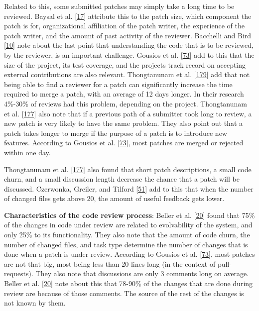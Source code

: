 \documentclass[]{book}
\begin{document}
Related to this, some submitted patches may simply take a long time to
be reviewed. Baysal et al.
{[}\protect\hyperlink{ref-baysal2016investigating}{17}{]} attribute this
to the patch size, which component the patch is for, organizational
affiliation of the patch writer, the experience of the patch writer, and
the amount of past activity of the reviewer. Bacchelli and Bird
{[}\protect\hyperlink{ref-bacchelli2013expectations}{10}{]} note about
the last point that understanding the code that is to be reviewed, by
the reviewer, is an important challenge. Gousios et al.
{[}\protect\hyperlink{ref-gousios2014exploratory}{73}{]} add to this
that the size of the project, its test coverage, and the projects track
record on accepting external contributions are also relevant.
Thongtanunam et al.
{[}\protect\hyperlink{ref-thongtanunam2015should}{179}{]} add that not
being able to find a reviewer for a patch can significantly increase the
time required to merge a patch, with an average of 12 days longer. In
their research 4\%-30\% of reviews had this problem, depending on the
project. Thongtanunam et al.
{[}\protect\hyperlink{ref-thongtanunam2017review}{177}{]} also note that
if a previous path of a submitter took long to review, a new patch is
very likely to have the same problem. They also point out that a patch
takes longer to merge if the purpose of a patch is to introduce new
features. According to Gousios et al.
{[}\protect\hyperlink{ref-gousios2014exploratory}{73}{]}, most patches
are merged or rejected within one day.

Thongtanunam et al.
{[}\protect\hyperlink{ref-thongtanunam2017review}{177}{]} also found
that short patch descriptions, a small code churn, and a small
discussion length decrease the chance that a patch will be discussed.
Czerwonka, Greiler, and Tilford
{[}\protect\hyperlink{ref-czerwonka2015code}{51}{]} add to this that
when the number of changed files gets above 20, the amount of useful
feedback gets lower.

\textbf{Characteristics of the code review process}: Beller et al.
{[}\protect\hyperlink{ref-beller2014modern}{20}{]} found that 75\% of
the changes in code under review are related to evolvability of the
system, and only 25\% to its functionality. They also note that the
amount of code churn, the number of changed files, and task type
determine the number of changes that is done when a patch is under
review. According to Gousios et al.
{[}\protect\hyperlink{ref-gousios2014exploratory}{73}{]}, most patches
are not that big, most being less than 20 lines long (in the context of
pull-requests). They also note that discussions are only 3 comments long
on average. Beller et al.
{[}\protect\hyperlink{ref-beller2014modern}{20}{]} note about this that
78-90\% of the changes that are done during review are because of those
comments. The source of the rest of the changes is not known by them.
\end{document}
